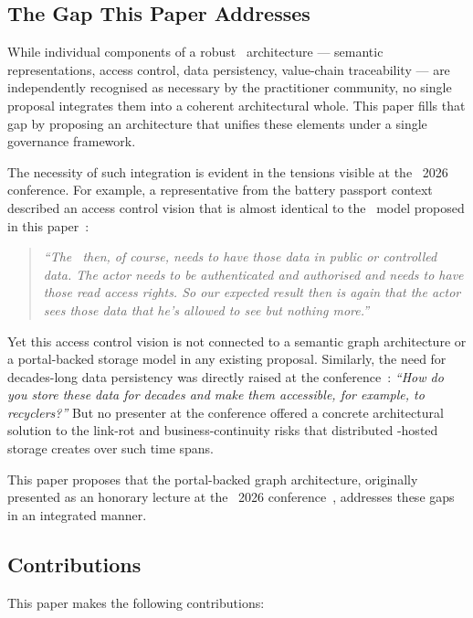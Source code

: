 \subsection{The Gap This Paper Addresses}

While individual components of a robust \DPP\ architecture --- semantic
representations, access control, data persistency, value-chain traceability ---
are independently recognised as necessary by the practitioner community, no
single proposal integrates them into a coherent architectural whole. This paper
fills that gap by proposing an architecture that unifies these elements under a
single governance framework.

The necessity of such integration is evident in the tensions visible at the
\DPPforEU~2026 conference. For example, a representative from the battery
passport context described an
access control vision that is almost identical to the \ABAC\ model proposed in
this paper~\cite{dpp4eu2026_day2}:

\begin{quote}\emph{
``The \DPP\ then, of course, needs to have those data in public or controlled
data. The actor needs to be authenticated and authorised and needs to have those
read access rights. So our expected result then is again that the actor sees
those data that he's allowed to see but nothing more.''}
\end{quote}

Yet this access control vision is not connected to a semantic graph architecture
or a portal-backed storage model in any existing proposal. Similarly, the need
for decades-long data persistency was directly raised at the
conference~\cite{dpp4eu2026_day1}: \emph{``How do you store these data for
decades and make them accessible, for example, to recyclers?''} But no presenter
at the conference offered a concrete architectural solution to the link-rot and
business-continuity risks that distributed \REO-hosted storage creates over such
time spans.

This paper proposes that the portal-backed graph architecture, originally
presented as an honorary lecture at the \DPPforEU~2026
conference~\cite{dpp4eu2026_day2}, addresses these gaps in an integrated manner.

\subsection{Contributions}

This paper makes the following contributions:

